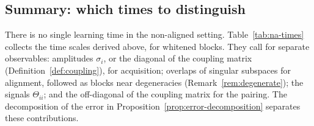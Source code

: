 \documentclass[11pt]{article}
\theoremstyle{definition}
\numberwithin{equation}{section}
\begin{document}
\subsection{Summary: which times to distinguish}\label{sec:na-summary}

There is no single learning time in the non-aligned setting. Table~\ref{tab:na-times} collects the time scales derived above, for whitened blocks. They call for separate observables: amplitudes $\sigma_i$, or the diagonal of the coupling matrix (Definition~\ref{def:coupling}), for acquisition; overlaps of singular subspaces for alignment, followed as blocks near degeneracies (Remark~\ref{rem:degenerate}); the signals $\Theta_{ii}$; and the off-diagonal of the coupling matrix for the pairing. The decomposition of the error in Proposition~\ref{prop:error-decomposition} separates these contributions.
\end{document}
